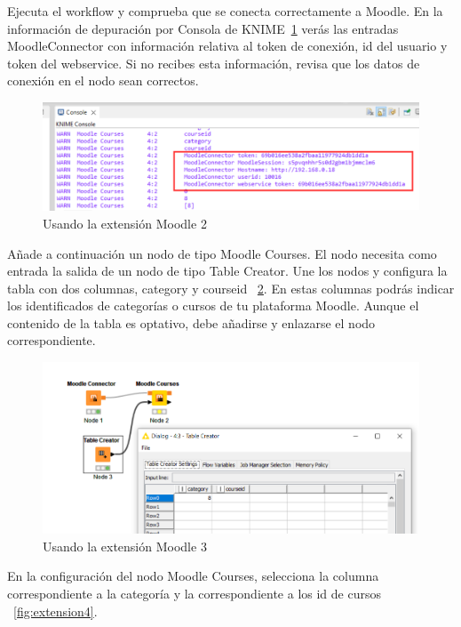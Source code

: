Ejecuta el workflow y comprueba que se conecta correctamente a Moodle. En la información de 
depuración por Consola de KNIME~\ref{fig:extension2} verás las entradas MoodleConnector con 
información relativa al token de conexión, id del usuario y token del webservice. 
Si no recibes esta información, revisa que los datos de conexión en el nodo sean correctos. 
\

\begin{figure}[!htb]
	\centering
	\includegraphics[width=1\textwidth]{img/manual_usuario_moodle_connector_login.png}
	\caption{Usando la extensión Moodle 2}
	\label{fig:extension2}
\end{figure}
\FloatBarrier

Añade a continuación un nodo de tipo Moodle Courses. El nodo necesita como entrada la salida de un nodo de tipo Table Creator. 
Une los nodos y configura la tabla con dos columnas, category y courseid ~\ref{fig:extension3}. En estas columnas podrás indicar 
los identificados de categorías o cursos de tu plataforma Moodle. Aunque el contenido de la tabla 
es optativo, debe añadirse y enlazarse el nodo correspondiente. 

\begin{figure}[!htb]
	\centering
	\includegraphics[width=1\textwidth]{img/manual_usuario_moodle_courses_table.png}
	\caption{Usando la extensión Moodle 3}
	\label{fig:extension3}
\end{figure}
\FloatBarrier


En la configuración del nodo Moodle Courses, selecciona la columna 
correspondiente a la categoría y la correspondiente a los id de cursos ~\ref{fig:extension4}. 

